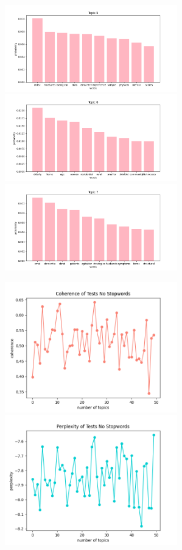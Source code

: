 \documentclass[10pt]{article} %
\begin{document}
\begin{center}
		\includegraphics[width=7.5cm]{images/plots/test_8_no_stopwords_dataset_2/topic_5.png}
		\includegraphics[width=7.5cm]{images/plots/test_8_no_stopwords_dataset_2/topic_6.png}
		\includegraphics[width=7.5cm]{images/plots/test_8_no_stopwords_dataset_2/topic_7.png}	
		
	\end{center}

	\begin{center}
		\includegraphics[width=7.5cm]{images/coherence_no_stopwords_2}
		\includegraphics[width=7.5cm]{images/perplexity_no_stopwords_2}
	\end{center}
\end{document}
